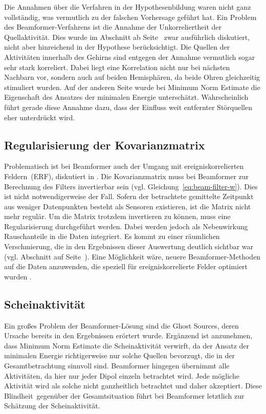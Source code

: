 \documentclass[doc,a4paper,12pt]{apa6}
\makeatletter
\DeclareRobustCommand*{\nameref}[1]{%
      \glqq{\myorg@nameref{#1}}\grqq%
    }%
\makeatother
\begin{document}
Die Annahmen über die Verfahren in der Hypothesenbildung waren nicht ganz vollständig, was vermutlich zu der falschen Vorhersage geführt hat. Ein Problem des Beamformer-Verfahrens ist die Annahme der Unkorreliertheit der Quellaktivität. Dies wurde im Abschnitt \nameref{sec:beam} ab Seite~\pageref{sec:beam} zwar ausführlich diskutiert, nicht aber hinreichend in der Hypothese berücksichtigt. Die Quellen der Aktivitäten innerhalb des Gehirns sind entgegen der Annahme vermutlich sogar sehr stark korreliert. Dabei liegt eine Korrelation nicht nur bei nächsten Nachbarn vor, sondern auch auf beiden Hemisphären, da beide Ohren gleichzeitig stimuliert wurden. Auf der anderen Seite wurde bei Minimum Norm Estimate die Eigenschaft des Ansatzes der minimalen Energie unterschätzt. Wahrscheinlich führt gerade diese Annahme dazu, dass der Einfluss weit entfernter Störquellen eher unterdrückt wird.

\subsection{Regularisierung der Kovarianzmatrix}
\label{sec:regu-kov}

Problematisch ist bei Beamformer auch der Umgang mit ereigniskorrelierten Feldern~(ERF), diskutiert in \textcite{hansen2010meg}. Die Kovarianzmatrix muss bei Beamformer zur Berechnung des Filters invertierbar sein (vgl. Gleichung~\ref{eq:beam-filter-w}). Dies ist nicht notwendigerweise der Fall. Sofern der betrachtete gemittelte Zeitpunkt aus weniger Datenpunkten besteht als Sensoren existieren, ist die Matrix nicht mehr regulär. Um die Matrix trotzdem invertieren zu können, muss eine Regularisierung durchgeführt werden. Dabei werden jedoch als Nebenwirkung Rauschanteile in die Daten integriert. Es kommt zu einer räumlichen Verschmierung, die in den Ergebnissen dieser Auswertung deutlich sichtbar war (vgl. Abschnitt \nameref{sec:akti-verteilung} auf Seite~\pageref{sec:akti-verteilung}). Eine Möglichkeit wäre, neuere Beamformer-Methoden auf die Daten anzuwenden, die speziell für ereigniskorrelierte Felder optimiert wurden \parencite[z.B.][]{cheyne2007event}.

\subsection{Scheinaktivität}

Ein großes Problem der Beamformer-Lösung sind die Ghost Sources, deren Ursache bereits in den Ergebnissen erörtert wurde. Ergänzend ist anzunehmen, dass Minimum Norm Estimate die Scheinaktivität verwirft, da der Ansatz der minimalen Energie richtigerweise nur solche Quellen bevorzugt, die in der Gesamtbetrachtung sinnvoll sind. Beamformer hingegen übernimmt alle Aktivitäten, da hier nur jeder Dipol einzeln betrachtet wird. Jede mögliche Aktivität wird als solche nicht ganzheitlich betrachtet und daher akzeptiert. Diese \glqq Blindheit\grqq ~gegenüber der Gesamtsituation führt bei Beamformer letztlich zur Schätzung der Scheinaktivität.
\end{document}
